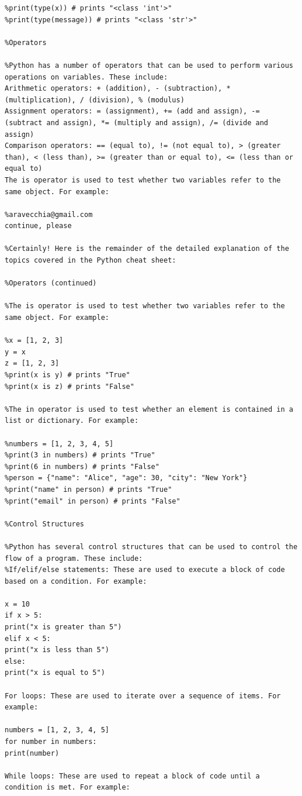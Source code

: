 \begin{lstlisting}
%print(type(x)) # prints "<class 'int'>"
%print(type(message)) # prints "<class 'str'>"

%Operators

%Python has a number of operators that can be used to perform various operations on variables. These include:
Arithmetic operators: + (addition), - (subtraction), * (multiplication), / (division), % (modulus)
Assignment operators: = (assignment), += (add and assign), -= (subtract and assign), *= (multiply and assign), /= (divide and assign)
Comparison operators: == (equal to), != (not equal to), > (greater than), < (less than), >= (greater than or equal to), <= (less than or equal to)
The is operator is used to test whether two variables refer to the same object. For example:

%aravecchia@gmail.com
continue, please

%Certainly! Here is the remainder of the detailed explanation of the topics covered in the Python cheat sheet:

%Operators (continued)

%The is operator is used to test whether two variables refer to the same object. For example:

%x = [1, 2, 3]
y = x
z = [1, 2, 3]
%print(x is y) # prints "True"
%print(x is z) # prints "False"

%The in operator is used to test whether an element is contained in a list or dictionary. For example:

%numbers = [1, 2, 3, 4, 5]
%print(3 in numbers) # prints "True"
%print(6 in numbers) # prints "False"
%person = {"name": "Alice", "age": 30, "city": "New York"}
%print("name" in person) # prints "True"
%print("email" in person) # prints "False"

%Control Structures

%Python has several control structures that can be used to control the flow of a program. These include:
%If/elif/else statements: These are used to execute a block of code based on a condition. For example:

x = 10
if x > 5:
print("x is greater than 5")
elif x < 5:
print("x is less than 5")
else:
print("x is equal to 5")

For loops: These are used to iterate over a sequence of items. For example:

numbers = [1, 2, 3, 4, 5]
for number in numbers:
print(number)

While loops: These are used to repeat a block of code until a condition is met. For example:


\end{lstlisting}
